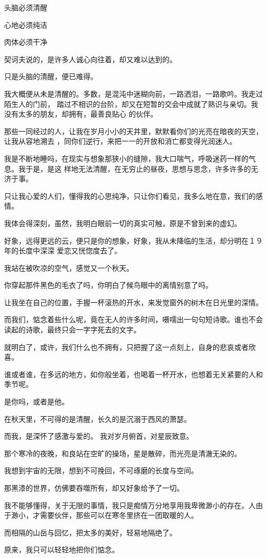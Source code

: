 \documentclass[12pt,a4paper]{article}
\begin{document}
	\endwriting



		头脑必须清醒 \par
		心地必须纯洁 \par
		肉体必须干净

		契诃夫说的，是许多人诚心向往着，却又难以达到的。\par
		只是头脑的清醒，便已难得。

		我大概便从未是清醒的。多数，是混沌中迷糊向前，一路洒泪，一路歌吟。我走过陌生人的门前，
	踏过不相识的台阶，却又在短暂的交会中成就了熟识与亲切。我没有太多的朋友，却拥有，最善良贴心
	的伙伴。

		那些一同经过的人，让我在岁月小小的天井里，默默看你们的光亮在暗夜的天空，让我从容地溯去
	，同你们逆行，来把一一的开放和消亡都变得光润迷人。

		我是不断地睡吗，在现实与想象那狭小的缝隙，我大口喘气，呼吸迷药一样的气息。我于是，是这
	样地无法清醒，在无穷止的昼夜，思想与思念，许多许多的无济于事。

		只让我心爱的人们，懂得我的心思纯净，只让你们看见，我多么地在意，我们的感情。

		我体会得深刻，虽然，我明白眼前一切的真实可触，原是不曾到来的虚幻。

		好象，远得更远的云，便只是你的想象，好象，我从未降临的生活，却分明在１９年的长度中深深
	爱恋又恍惚度去了。

		我站在被吹凉的空气，感觉又一个秋天。\par
		你穿起那件黑色的毛衣了吗，你明白了候鸟眼中的离情别意了吗。

		让我坐在自己的位置，手握一杯滚热的开水，来发觉窗外的树木在日光里的深情。\par
		而我们，惦念着些什么呢，竟在无人的许多时间，嗫嚅出一句句短诗歌。谁也不会读起的诗歌，最终只会一字字死去的文字。\par
		就明白了，或许，我们什么也不拥有，只把握了这一点刻上，自身的悲哀或者欣喜。\par
		谁或者谁，在多远的地方，如你般坐着，也喝着一杯开水，也想着无关紧要的人和季节呢。\par
		是你吗，或者是他。\par
		在秋天里，不可得的是清醒，长久的是沉溺于西风的萧瑟。

		而我，是深怀了感激与爱的。
		我对岁月俯首，对星辰致意。\par
		那个寒冷的夜晚，和良站在空旷的操场，星是散碎，而光亮是清澈无染的。

		我想到宇宙的无限，想到不可挽回，不可琢磨的长度与空间。\par
		那黑漆的世界，仿佛要吞噬所有，却又好象给予了一切。\par
		我不能够懂得，关于无限的事情，我只是痴情万分地享用我卑微渺小的存在。人由于渺小，才需要伙伴，那些可以在寒冬里挤在一团取暖的人。\par
		而相隔的山岳与回忆，把太多的美好，轻易地隔绝了。\par
		原来，我只可以轻轻地把你们惦念。
\end{document}
